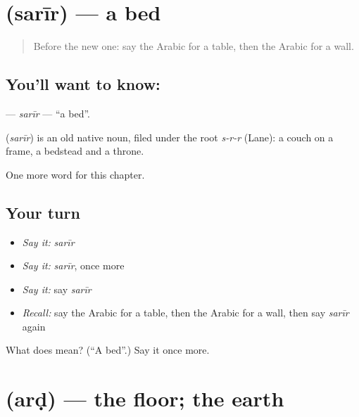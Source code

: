 \section[\texorpdfstring{\ar{سرير} (sarīr)}{سرير (sarīr)}]{ (sarīr) — a bed}

\label{lesson:AR-C70-sarir}



\begin{quote}
Before the new one: say the Arabic for a table, then the Arabic for a wall.
\end{quote}

\subsection*{You'll want to know: }
\textbf{} — \emph{sarīr} — \textquotedblleft{}a bed\textquotedblright{}.

\begin{cousinweb}
\textbf{} (\emph{sarīr}) is an old native noun, filed under the root \emph{s-r-r} (Lane): a couch on a frame, a bedstead and a throne.
\end{cousinweb}

\begin{grammarlens}[title={What you've built}]
One more word for this chapter.
\end{grammarlens}

\subsection*{Your turn}
\begin{itemize}
\raggedright
  \item \emph{Say it:} \emph{sarīr}
  \item \emph{Say it:} \emph{sarīr}, once more
  \item \emph{Say it:} say \emph{sarīr}
  \item \emph{Recall:} say the Arabic for a table, then the Arabic for a wall, then say \emph{sarīr} again
\end{itemize}

\begin{tcolorbox}[breakable,colback=teal!4,colframe=teal!35!black,title={Before you move on}]
What does  mean? (\textquotedblleft{}A bed\textquotedblright{}.) Say it once more.
\end{tcolorbox}
\section[\texorpdfstring{\ar{أرض} (arḍ)}{أرض (arḍ)}]{ (arḍ) — the floor; the earth}

